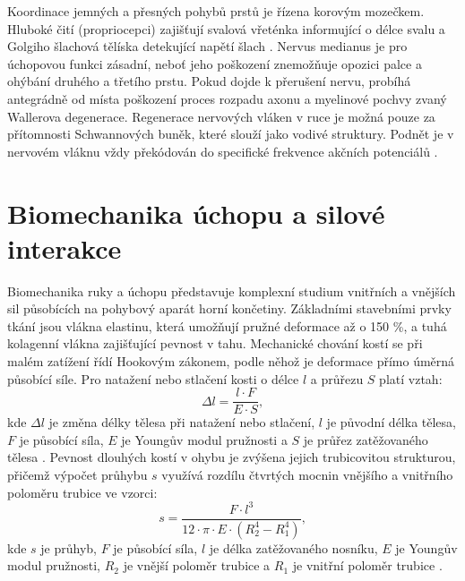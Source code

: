 \documentclass[FZS,DP]{tulthesis}
\begin{document}
Koordinace jemných a přesných pohybů prstů je řízena korovým mozečkem. Hluboké čití (propriocepci) zajišťují svalová vřeténka informující o délce svalu a Golgiho šlachová tělíska detekující napětí šlach \cite{Stuchla2024}. Nervus medianus je pro úchopovou funkci zásadní, neboť jeho poškození znemožňuje opozici palce a ohýbání druhého a třetího prstu. Pokud dojde k přerušení nervu, probíhá antegrádně od místa poškození proces rozpadu axonu a myelinové pochvy zvaný Wallerova degenerace. Regenerace nervových vláken v ruce je možná pouze za přítomnosti Schwannových buněk, které slouží jako vodivé struktury. Podnět je v nervovém vláknu vždy překódován do specifické frekvence akčních potenciálů \cite{Cihak2016}.


\section{Biomechanika úchopu a silové interakce}

Biomechanika ruky a úchopu představuje komplexní studium vnitřních a vnějších sil působících na pohybový aparát horní končetiny. Základními stavebními prvky tkání jsou vlákna elastinu, která umožňují pružné deformace až o 150 \%, a tuhá kolagenní vlákna zajišťující pevnost v tahu. Mechanické chování kostí se při malém zatížení řídí Hookovým zákonem, podle něhož je deformace přímo úměrná působící síle. Pro natažení nebo stlačení kosti o délce $l$ a průřezu $S$ platí vztah:
\begin{equation}
\Delta l = \frac{l \cdot F}{E \cdot S},
\end{equation}
kde $\Delta l$ je změna délky tělesa při natažení nebo stlačení,
$l$ je původní délka tělesa, $F$ je působící síla, $E$ je Youngův
modul pružnosti a $S$ je průřez zatěžovaného tělesa \cite{Benes2022}. Pevnost dlouhých kostí v ohybu je zvýšena jejich trubicovitou strukturou, přičemž výpočet průhybu $s$ využívá rozdílu čtvrtých mocnin vnějšího a vnitřního poloměru trubice ve vzorci:
\begin{equation}
s = \frac{F \cdot l^3}{12 \cdot \pi \cdot E \cdot (R_2^4 - R_1^4)},
\end{equation}
kde $s$ je průhyb, $F$ je působící síla, $l$ je délka zatěžovaného
nosníku, $E$ je Youngův modul pružnosti, $R_2$ je vnější poloměr
trubice a $R_1$ je vnitřní poloměr trubice \cite{Benes2022}.
\end{document}
